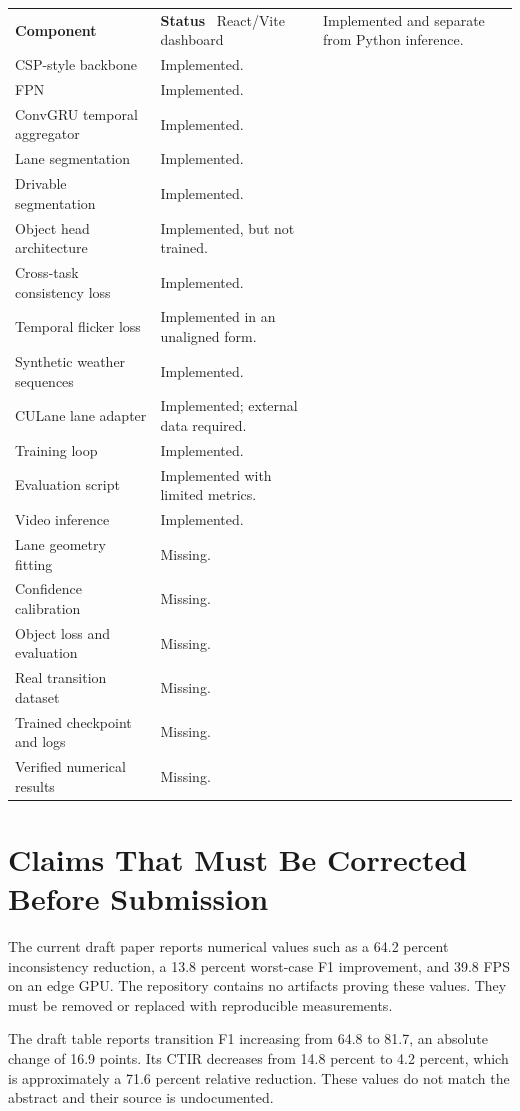 \documentclass[11pt,a4paper]{article}
\begin{document}
\begin{longtable}{p{}p{}}
\toprule
\textbf{Component} & \textbf{Status}\
\midrule
React/Vite dashboard & Implemented and separate from Python inference.\\
CSP-style backbone & Implemented.\\
FPN & Implemented.\\
ConvGRU temporal aggregator & Implemented.\\
Lane segmentation & Implemented.\\
Drivable segmentation & Implemented.\\
Object head architecture & Implemented, but not trained.\\
Cross-task consistency loss & Implemented.\\
Temporal flicker loss & Implemented in an unaligned form.\\
Synthetic weather sequences & Implemented.\\
CULane lane adapter & Implemented; external data required.\\
Training loop & Implemented.\\
Evaluation script & Implemented with limited metrics.\\
Video inference & Implemented.\\
Lane geometry fitting & Missing.\\
Confidence calibration & Missing.\\
Object loss and evaluation & Missing.\\
Real transition dataset & Missing.\\
Trained checkpoint and logs & Missing.\\
Verified numerical results & Missing.\\
\bottomrule
\end{longtable}

\section{Claims That Must Be Corrected Before Submission}

The current draft paper reports numerical values such as a 64.2 percent inconsistency reduction, a 13.8 percent worst-case F1 improvement, and 39.8 FPS on an edge GPU. The repository contains no artifacts proving these values. They must be removed or replaced with reproducible measurements.

The draft table reports transition F1 increasing from 64.8 to 81.7, an absolute change of 16.9 points. Its CTIR decreases from 14.8 percent to 4.2 percent, which is approximately a 71.6 percent relative reduction. These values do not match the abstract and their source is undocumented.
\end{document}

